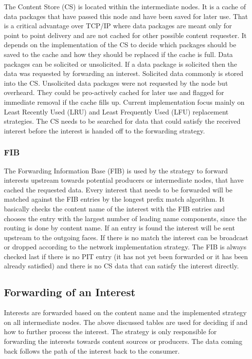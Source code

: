 The Content Store (CS) is located within the intermediate nodes. It is a cache of data packages that have passed this node and have been saved for later use. That is a critical advantage over TCP/IP where data packages are meant only for point to point delivery and are not cached for other possible content requester. It depends on the implementation of the CS to decide which packages should be saved to the cache and how they should be replaced if the cache is full. Data packages can be solicited or unsolicited. If a data package is solicited then the data was requested by forwarding an interest. Solicited data commonly is stored into the CS. Unsolicited data packages were not requested by the node but overheard. They could be pro-actively cached for later use and flagged for immediate removal if the cache fills up. Current implementation focus mainly on Least Recently Used (LRU) and Least Frequently Used (LFU) replacement strategies. The CS needs to be searched for data that could satisfy the received interest before the interest is handed off to the forwarding strategy.

\subsubsection{FIB}

The Forwarding Information Base (FIB) is used by the strategy to forward interests upstream towards potential producers or intermediate nodes, that have cached the requested data. Every interest that needs to be forwarded will be matched against the FIB entries by the longest prefix match algorithm. It basically checks the content name of the interest with the FIB entries and chooses the entry with the largest number of leading name components, since the routing is done by content name. If an entry is found the interest will be sent upstream to the outgoing faces. If there is no match the interest can be broadcast or dropped according to the network implementation strategy. The FIB is always checked last if there is no PIT entry (it has not yet been forwarded or it has been already satisfied) and there is no CS data that can satisfy the interest directly.

\subsection{Forwarding of an Interest}

Interests are forwarded based on the content name and the implemented strategy on all intermediate nodes. The above discussed tables are used for deciding if and how to further process the interest. The strategy is only responsible for forwarding the interests towards content sources or producers. The data coming back follows the path of the interest back to the consumer.

